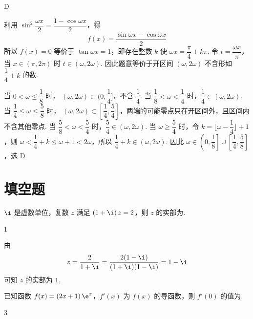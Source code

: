\begin{answer}
D
\end{answer}

\begin{solution}
利用 \(\sin^2\dfrac{\omega x}{2}=\dfrac{1-\cos\omega x}{2}\)，得
\[
f(x)=\dfrac{\sin\omega x-\cos\omega x}{2}
\]
所以 \(f(x)=0\) 等价于
\(\tan\omega x=1\)，即存在整数 \(k\) 使
\(\omega x=\dfrac\pi4+k\pi\). 令 \(t=\dfrac{\omega x}{\pi}\)，当
\(x\in(\pi,2\pi)\) 时 \(t\in(\omega,2\omega)\). 因此题意等价于开区间
\((\omega,2\omega)\) 不含形如 \(\dfrac14+k\) 的数.

当 \(0<\omega\leqslant\dfrac18\) 时，
\((\omega,2\omega)\subset(0,\dfrac14]\)，不含 \(\dfrac14\). 当
\(\dfrac18<\omega<\dfrac14\) 时，\(\dfrac14\in(\omega,2\omega)\).
当 \(\dfrac14\leqslant\omega\leqslant\dfrac58\) 时，
\((\omega,2\omega)\subset[\dfrac14,\dfrac54]\)，两端的可能零点只在开区间外，且区间内不含其他零点.
当 \(\dfrac58<\omega<\dfrac54\) 时，\(\dfrac54\in(\omega,2\omega)\). 当
\(\omega\geqslant\dfrac54\) 时，令 \(k=\lfloor\omega-\dfrac14\rfloor+1\)，则
\(\omega<\dfrac14+k\leqslant\omega+1<2\omega\)，所以
\(\dfrac14+k\in(\omega,2\omega)\).
因此
\(\omega\in\left(0,\dfrac18\right]\cup\left[\dfrac14,\dfrac58\right]\)，选 D.
\end{solution}

\section{填空题}

\begin{problem}
\(\i\) 是虚数单位，复数 \( z \) 满足 \( \left( 1+\i \right)z=2 \)，则 \( z \) 的实部为\fillinblank{}.
\end{problem}

\begin{answer}
1
\end{answer}

\begin{solution}
由
\[
z=\dfrac{2}{1+\i}=\dfrac{2(1-\i)}{(1+\i)(1-\i)}=1-\i
\]
可知 \(z\) 的实部为 \(1\).
\end{solution}

\begin{problem}
已知函数 \( f(x)=\left( 2x+1 \right)\e^x \)，\( f'(x) \) 为 \( f(x) \) 的导函数，则 \( f'(0) \) 的值为\fillinblank{}.
\end{problem}

\begin{answer}
3
\end{answer}


